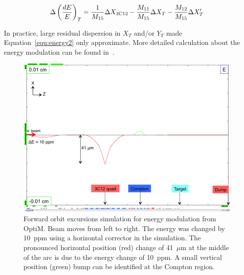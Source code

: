 \begin{equation} \label{equ:energy2}
\Delta\left(\frac{dE}{E} \right)_{T} = \frac{1}{M_{15}}\Delta X_{\rm 3C12} - \frac{M_{11}}{M_{15}}\Delta X_{T} - \frac{M_{12}}{M_{15}}\Delta X^{\prime}_{T}
\end{equation}

\noindent
In practice, large residual dispersion in $X_{T}$ and/or $Y_{T}$ made Equation~\ref{equ:energy2} only approximate.
More detailed calculation about the energy modulation can be found in~\cite{nur_bm_energy}.

\begin{singlespace}
\begin{figure}[!h]
	\begin{center}
	\includegraphics[width=12.0cm]{figures/BModEnergy}
	\end{center}
	\caption
	{Forward orbit excursions simulation for energy modulation from OptiM. Beam moves from left to right. The energy was changed by 10~ppm using a horizontal corrector in the simulation. The pronounced horizontal position (red) change of 41~$\mu$m at the middle of the arc is due to the energy change of 10~ppm. A small vertical position (green) bump can be identified at the Compton region.}
	\label{fig:BModEnergy}
\end{figure}
\end{singlespace}


